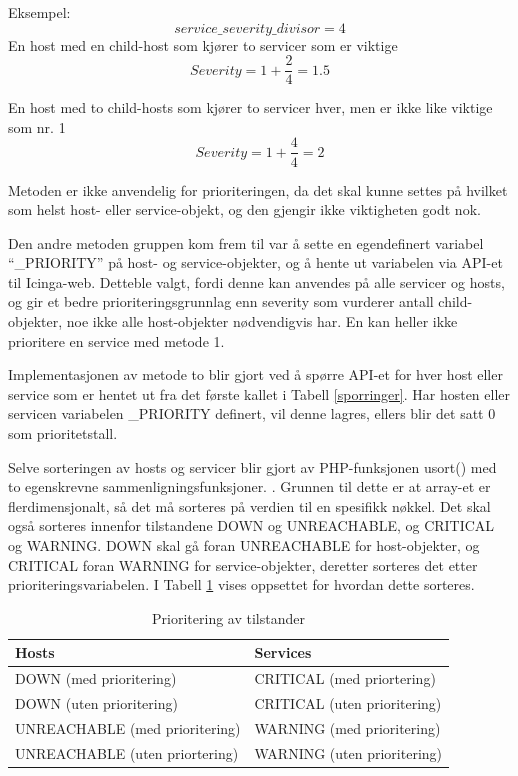 Eksempel:
\begin{equation}
service\_severity\_divisor = 4 
\end{equation}
En host med en child-host som kjører to servicer som er viktige
\begin{equation}
Severity = 1 + \frac{2}{4} = 1.5
\end{equation}

En host med to child-hosts som kjører to servicer hver, men er ikke like viktige som nr. 1
\begin{equation}
Severity = 1 + \frac{4}{4} = 2
\end{equation}

Metoden er ikke anvendelig for prioriteringen, da det skal kunne settes på hvilket som helst host- eller service-objekt, og den gjengir ikke viktigheten godt nok.     

Den andre metoden gruppen kom frem til var å sette en egendefinert variabel ``\_PRIORITY'' på host- og service-objekter, og å hente ut variabelen via API-et til Icinga-web. Detteble valgt, fordi denne kan anvendes på alle servicer og hosts, og gir et bedre prioriteringsgrunnlag enn severity som vurderer antall child-objekter, noe ikke alle host-objekter nødvendigvis har. En kan heller ikke prioritere en service med metode 1.

Implementasjonen av metode to blir gjort ved å spørre API-et for hver host eller service som er hentet ut fra det første kallet i Tabell \ref{sporringer}. Har hosten eller servicen variabelen \_PRIORITY definert, vil denne lagres, ellers blir det satt 0 som prioritetstall.

Selve sorteringen av hosts og servicer blir gjort av PHP-funksjonen usort() med to egenskrevne sammenligningsfunksjoner. \cite{usort}. Grunnen til dette er at array-et er flerdimensjonalt, så det må sorteres på verdien til en spesifikk nøkkel. Det skal også sorteres innenfor tilstandene DOWN og UNREACHABLE, og CRITICAL og WARNING. DOWN skal gå foran UNREACHABLE for host-objekter, og CRITICAL foran WARNING for service-objekter, deretter sorteres det etter prioriteringsvariabelen. I Tabell \ref{prioritering} vises oppsettet for hvordan dette sorteres.

\begin{table}
\begin{center}
\begin{tabular}{ | l | l |} \hline
    \textbf{Hosts} & \textbf{Services} \\ \hline
    DOWN (med prioritering) & CRITICAL (med priortering) \\ \hline
    DOWN (uten prioritering) & CRITICAL (uten prioritering) \\ \hline
    UNREACHABLE (med prioritering) & WARNING (med prioritering) \\ \hline
    UNREACHABLE (uten priortering) & WARNING (uten prioritering) \\ \hline
\end{tabular}
\caption{Prioritering av tilstander}
\label{prioritering}
\end{center}
\end{table}
